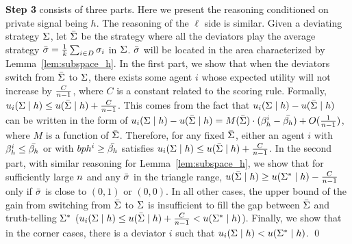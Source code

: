 \textbf{Step 3} consists of three parts. Here we present the reasoning conditioned on private signal being $h$. The reasoning of the $\ell$ side is similar. Given a deviating strategy $\Sigma$, let $\bar{\Sigma}$ be the strategy where all the deviators play the average strategy $\bar{\sigma} = \frac1k \sum_{i \in D} \sigma_i$ in $\Sigma$. $\bar{\sigma}$ will be located in the area characterized by Lemma~\ref{lem:subspace_h}. In the first part, we show that when the deviators switch from $\bar{\Sigma}$ to $\Sigma$, there exists some agent $i$ whose expected utility will not increase by $\frac{C}{n - 1}$, where $C$ is a constant related to the scoring rule. Formally, $u_i(\Sigma \mid h) \le u(\bar{\Sigma} \mid h) + \frac{C}{n - 1}$. This comes from the fact that $u_i(\Sigma \mid h) - u(\bar{\Sigma} \mid h)$ can be written in the form of $u_i(\Sigma \mid h) - u(\bar{\Sigma} \mid h) = M(\bar{\Sigma}) \cdot (\beta_{h}^i - \bar{\beta_{h}}) + O(\frac{1}{n - 1})$, where $M$ is a function of $\bar{\Sigma}$. Therefore, for any fixed $\bar{\Sigma}$, either an agent $i$ with $\beta_{h}^i \le \bar{\beta_{h}}$ or with $bph^i \ge \bar{\beta_{h}}$ satisfies $u_i(\Sigma \mid h) \le u(\bar{\Sigma} \mid h) + \frac{C}{n - 1}$.
In the second part, with similar reasoning for Lemma~\ref{lem:subspace_h}, we show that for sufficiently large $n$ and any $\bar{\sigma}$ in the triangle range, $u(\bar{\Sigma} \mid h) \ge u(\Sigma^* \mid h) - \frac{C}{n - 1}$ only if $\bar{\sigma}$ is close to $(0, 1)$ or $(0, 0)$. In all other cases, the upper bound of the gain from switching from $\bar{\Sigma}$ to $\Sigma$ is insufficient to fill the gap between $\bar{\Sigma}$ and truth-telling $\Sigma^*$ ($u_i(\Sigma \mid h) \le u(\bar{\Sigma} \mid h) + \frac{C}{n - 1} < u(\Sigma^* \mid h)$). Finally, we show that in the corner cases, there is a deviator $i$ such that $u_i(\Sigma \mid h) < u(\Sigma^* \mid h)$. \qed

    
    

